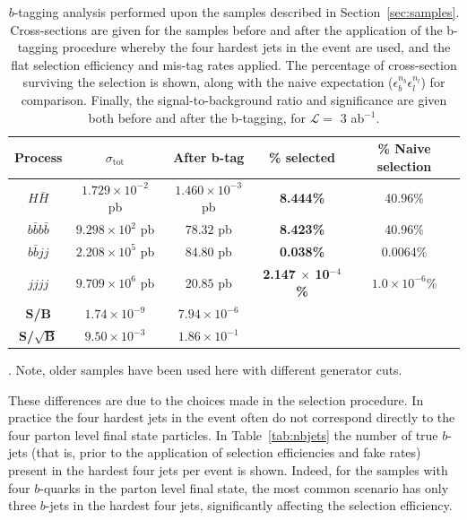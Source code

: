 \documentclass[12pt]{article}
\begin{document}
\begin{table}[h]
\begin{center}
\begin{tabular}{|c|c|c|c|c|}
\hline
Process & $\sigma_{\mathrm{tot}}$ & After b-tag & \% selected & \% Naive selection \\
\hline \hline
$H\bar{H}$ & $1.729 \times 10^{-2}$ pb & $1.460\times 10^{-3}$ pb & \textbf{8.444\%} & 40.96\% \\
\hline
$b\bar{b}b\bar{b}$ & $9.298 \times10^2$ pb & $78.32$ pb & \textbf{8.423\%} & 40.96\%\\
$b\bar{b}jj$ &  $2.208 \times 10^5$ pb & $84.80$ pb & \textbf{0.038\%} & 0.0064\% \\
$jjjj$ & $9.709\times 10^6$ pb & $20.85$ pb & \textbf{2.147 $\times$ 10$^{-4}$\%} & $1.0\times 10^{-6}$\%\\
\hline
\textbf{S/B} & $1.74 \times 10^{-9}$ & $7.94 \times 10^{-6}$& \multicolumn{2}{c}{}\\
\cline{1-3}
\textbf{S/$\sqrt{\mathrm{\textbf{B}}}$}& $9.50 \times 10^{-3}$ & $1.86 \times 10^{-1}$& \multicolumn{2}{c}{}\\
\cline{1-3}
\end{tabular}
\end{center}
\caption{$b$-tagging analysis performed upon the samples described in Section~\ref{sec:samples}. Cross-sections are given for the samples before and after the application of the b-tagging procedure whereby the four hardest jets in the event are used, and the flat selection efficiency and mis-tag rates applied. The percentage of cross-section surviving the selection is shown, along with the naive expectation ($\epsilon_b^{n_b}\epsilon_l^{n_l}$) for comparison. Finally, the signal-to-background ratio and significance are given both before and after the b-tagging, for $\mathcal{L}=$ 3 ab$^{-1}$.} \label{tab:btageff1}. Note, older samples have been used here with different generator cuts.
\end{table}%

These differences are due to the choices made in the selection procedure. In practice the four hardest jets in the event often do not correspond directly to the four parton level final state particles. In Table~\ref{tab:nbjets} the number of true $b$-jets (that is, prior to the application of selection efficiencies and fake rates) present in the hardest four jets per event is shown. Indeed, for the samples with four $b$-quarks in the parton level final state, the most common scenario has only three $b$-jets in the hardest four jets, significantly affecting the selection efficiency.
\end{document}
